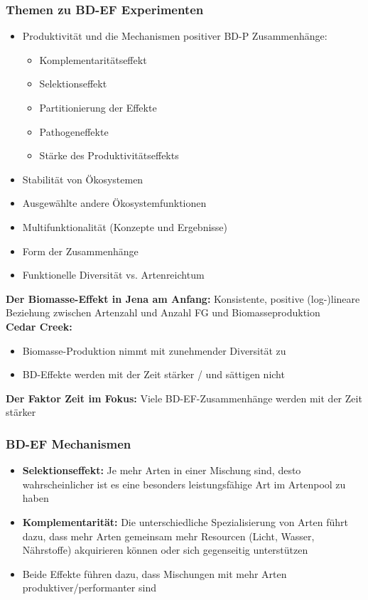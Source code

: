 \subsubsection{Themen zu BD-EF Experimenten}
\begin{itemize}
	\item Produktivität und die Mechanismen positiver BD-P Zusammenhänge:
	\begin{itemize}
		\item Komplementaritätseffekt
		\item Selektionseffekt
		\item Partitionierung der Effekte
		\item Pathogeneffekte
		\item Stärke des Produktivitätseffekts
	\end{itemize}
	\item Stabilität von Ökosystemen
	\item Ausgewählte andere Ökosystemfunktionen
	\item Multifunktionalität (Konzepte und Ergebnisse)
	\item Form der Zusammenhänge
	\item Funktionelle Diversität vs. Artenreichtum
\end{itemize}

\textbf{Der Biomasse-Effekt in Jena am Anfang:} Konsistente, positive (log-)lineare Beziehung zwischen Artenzahl und Anzahl FG und Biomasseproduktion
\\
\textbf{Cedar Creek:}
\begin{itemize}
	\item Biomasse-Produktion nimmt mit zunehmender Diversität zu
	\item BD-Effekte werden mit der Zeit stärker / und sättigen nicht
\end{itemize}

\textbf{Der Faktor Zeit im Fokus:} Viele BD-EF-Zusammenhänge werden mit der Zeit stärker

\newpage
\subsubsection{BD-EF Mechanismen}
\begin{itemize}
	\item \textbf{Selektionseffekt:} Je mehr Arten in einer Mischung sind, desto wahrscheinlicher ist es eine besonders leistungsfähige Art im Artenpool zu haben
	\item \textbf{Komplementarität:} Die unterschiedliche Spezialisierung von Arten führt dazu, dass mehr Arten gemeinsam mehr Resourcen (Licht, Wasser, Nährstoffe) akquirieren können oder sich gegenseitig unterstützen
	\item Beide Effekte führen dazu, dass Mischungen mit mehr Arten produktiver/performanter sind
\end{itemize}

